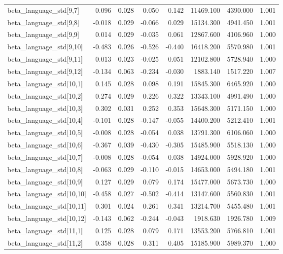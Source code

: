 \begin{tabular}{lrrrrrrr}
beta\_language\_std[9,7] & 0.096 & 0.028 & 0.050 & 0.142 & 11469.100 & 4390.000 & 1.001 \\
beta\_language\_std[9,8] & -0.018 & 0.029 & -0.066 & 0.029 & 15134.300 & 4941.450 & 1.001 \\
beta\_language\_std[9,9] & 0.014 & 0.029 & -0.035 & 0.061 & 12867.600 & 4106.960 & 1.000 \\
beta\_language\_std[9,10] & -0.483 & 0.026 & -0.526 & -0.440 & 16418.200 & 5570.980 & 1.001 \\
beta\_language\_std[9,11] & 0.013 & 0.023 & -0.025 & 0.051 & 12102.800 & 5728.940 & 1.000 \\
beta\_language\_std[9,12] & -0.134 & 0.063 & -0.234 & -0.030 & 1883.140 & 1517.220 & 1.007 \\
beta\_language\_std[10,1] & 0.145 & 0.028 & 0.098 & 0.191 & 15845.300 & 6465.920 & 1.000 \\
beta\_language\_std[10,2] & 0.274 & 0.029 & 0.226 & 0.322 & 13343.100 & 4991.490 & 1.000 \\
beta\_language\_std[10,3] & 0.302 & 0.031 & 0.252 & 0.353 & 15648.300 & 5171.150 & 1.000 \\
beta\_language\_std[10,4] & -0.101 & 0.028 & -0.147 & -0.055 & 14400.200 & 5212.410 & 1.001 \\
beta\_language\_std[10,5] & -0.008 & 0.028 & -0.054 & 0.038 & 13791.300 & 6106.060 & 1.000 \\
beta\_language\_std[10,6] & -0.367 & 0.039 & -0.430 & -0.305 & 15485.900 & 5518.130 & 1.000 \\
beta\_language\_std[10,7] & -0.008 & 0.028 & -0.054 & 0.038 & 14924.000 & 5928.920 & 1.000 \\
beta\_language\_std[10,8] & -0.063 & 0.029 & -0.110 & -0.015 & 14653.000 & 5494.180 & 1.001 \\
beta\_language\_std[10,9] & 0.127 & 0.029 & 0.079 & 0.174 & 15477.000 & 5673.730 & 1.000 \\
beta\_language\_std[10,10] & -0.458 & 0.027 & -0.502 & -0.414 & 13147.600 & 5560.830 & 1.001 \\
beta\_language\_std[10,11] & 0.301 & 0.024 & 0.261 & 0.341 & 13214.700 & 5455.480 & 1.001 \\
beta\_language\_std[10,12] & -0.143 & 0.062 & -0.244 & -0.043 & 1918.630 & 1926.780 & 1.009 \\
beta\_language\_std[11,1] & 0.125 & 0.028 & 0.079 & 0.171 & 13553.200 & 5766.810 & 1.001 \\
beta\_language\_std[11,2] & 0.358 & 0.028 & 0.311 & 0.405 & 15185.900 & 5989.370 & 1.000 \\

\end{tabular}
